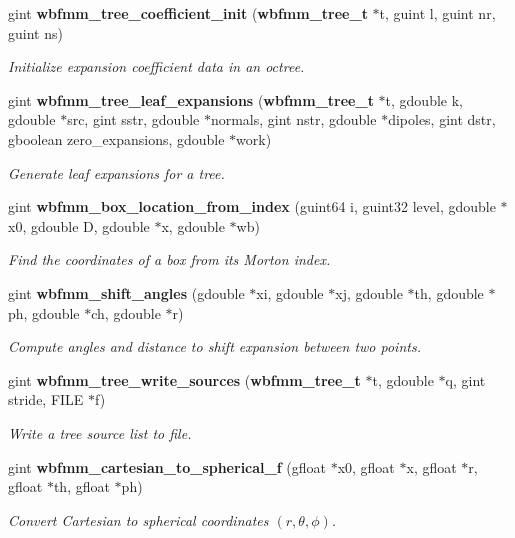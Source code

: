\begin{DoxyCompactItemize}
gint {\bf wbfmm\+\_\+tree\+\_\+coefficient\+\_\+init} ({\bf wbfmm\+\_\+tree\+\_\+t} $\ast$t, guint l, guint nr, guint ns)
\begin{DoxyCompactList}\small\item\em Initialize expansion coefficient data in an octree. \end{DoxyCompactList}\item 
gint {\bf wbfmm\+\_\+tree\+\_\+leaf\+\_\+expansions} ({\bf wbfmm\+\_\+tree\+\_\+t} $\ast$t, gdouble k, gdouble $\ast$src, gint sstr, gdouble $\ast$normals, gint nstr, gdouble $\ast$dipoles, gint dstr, gboolean zero\+\_\+expansions, gdouble $\ast$work)
\begin{DoxyCompactList}\small\item\em Generate leaf expansions for a tree. \end{DoxyCompactList}\item 
gint {\bf wbfmm\+\_\+box\+\_\+location\+\_\+from\+\_\+index} (guint64 i, guint32 level, gdouble $\ast$x0, gdouble D, gdouble $\ast$x, gdouble $\ast$wb)
\begin{DoxyCompactList}\small\item\em Find the coordinates of a box from its Morton index. \end{DoxyCompactList}\item 
gint {\bf wbfmm\+\_\+shift\+\_\+angles} (gdouble $\ast$xi, gdouble $\ast$xj, gdouble $\ast$th, gdouble $\ast$ph, gdouble $\ast$ch, gdouble $\ast$r)
\begin{DoxyCompactList}\small\item\em Compute angles and distance to shift expansion between two points. \end{DoxyCompactList}\item 
gint {\bf wbfmm\+\_\+tree\+\_\+write\+\_\+sources} ({\bf wbfmm\+\_\+tree\+\_\+t} $\ast$t, gdouble $\ast$q, gint stride, F\+I\+L\+E $\ast$f)
\begin{DoxyCompactList}\small\item\em Write a tree source list to file. \end{DoxyCompactList}\item 
gint {\bf wbfmm\+\_\+cartesian\+\_\+to\+\_\+spherical\+\_\+f} (gfloat $\ast$x0, gfloat $\ast$x, gfloat $\ast$r, gfloat $\ast$th, gfloat $\ast$ph)
\begin{DoxyCompactList}\small\item\em Convert Cartesian to spherical coordinates $(r,\theta,\phi)$. \end{DoxyCompactList}\item 

\end{DoxyCompactItemize}
